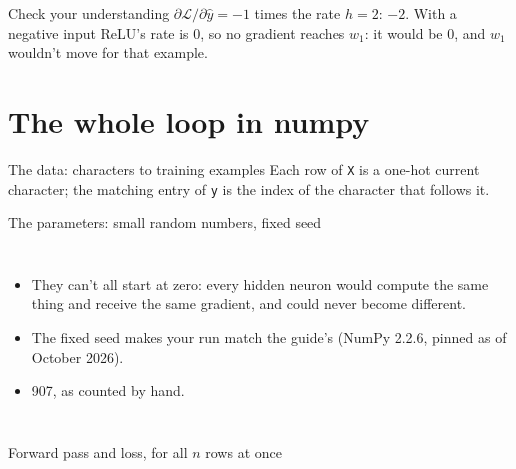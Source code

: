\documentclass[aspectratio=169,11pt,t,\primeropts]{beamer}
\begin{document}
\begin{frame}{Check your understanding}
  {$\partial\mathcal{L}/\partial\hat{y} = -1$ times the rate $h = 2$: $-2$. With a negative
    input ReLU's rate is 0, so no gradient reaches $w_1$: it would be $0$, and $w_1$ wouldn't
    move for that example.}
\end{frame}

\section{The whole loop in numpy}

\begin{frame}{The data: characters to training examples}
  Each row of \texttt{X} is a one-hot current character; the matching entry of \texttt{y} is
  the index of the character that follows it.
  \vspace{1mm}
\end{frame}

\begin{frame}{The parameters: small random numbers, fixed seed}
  \begin{columns}[T]
    \small
    \begin{itemize}
      \item They can't all start at zero: every hidden neuron would compute the same thing and
        receive the same gradient, and could never become different.
      \item The fixed seed makes your run match the guide's (NumPy 2.2.6, pinned as of October
        2026).
      \item 907, as counted by hand.
    \end{itemize}
  \end{columns}
\end{frame}

\begin{frame}{Forward pass and loss, for all $n$ rows at once}
\end{frame}
\end{document}
